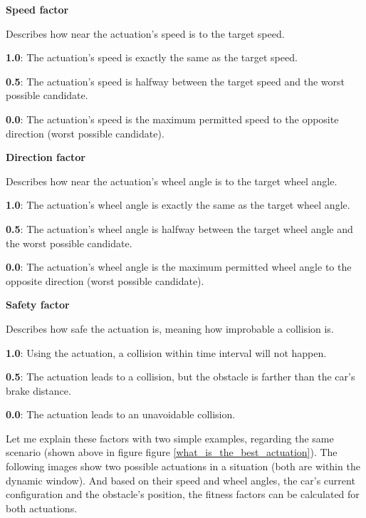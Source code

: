 \begin{minipage}{\textwidth}
\textbf{Speed factor}

Describes how near the actuation's speed is to the target speed.

\textbf{1.0}: The actuation's speed is exactly the same as the target speed.

\textbf{0.5}: The actuation's speed is halfway between the target speed and the worst possible candidate.

\textbf{0.0}: The actuation's speed is the maximum permitted speed to the opposite direction (worst possible candidate).
\end{minipage}

\begin{minipage}{\textwidth}
\textbf{Direction factor}

Describes how near the actuation's wheel angle is to the target wheel angle.

\textbf{1.0}: The actuation's wheel angle is exactly the same as the target wheel angle.

\textbf{0.5}: The actuation's wheel angle is halfway between the target wheel angle and the worst possible candidate.

\textbf{0.0}: The actuation's wheel angle is the maximum permitted wheel angle to the opposite direction (worst possible candidate).
\end{minipage}

\begin{minipage}{\textwidth}
\textbf{Safety factor}

Describes how safe the actuation is, meaning how improbable a collision is.

\textbf{1.0}: Using the actuation, a collision within time interval will not happen.

\textbf{0.5}: The actuation leads to a collision, but the obstacle is farther than the car's brake distance.

\textbf{0.0}: The actuation leads to an unavoidable collision.
\end{minipage}

Let me explain these factors with two simple examples, regarding the same scenario (shown above in figure figure \ref{what_is_the_best_actuation}).
The following images show two possible actuations in a situation (both are within the dynamic window). And based on their speed and wheel angles, the car's current configuration and the obstacle's position, the fitness factors can be calculated for both actuations.


